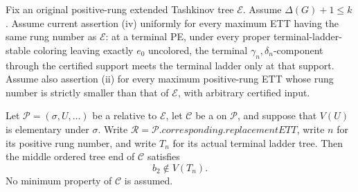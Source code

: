 \begin{lemma}
Fix an original positive-rung extended Tashkinov tree \(\mathcal E\).
Assume \(\Delta(G)+1\leq k\).  Assume current assertion (iv) uniformly
for every maximum ETT having the same rung number as \(\mathcal E\): at a
terminal PE, under every proper terminal-ladder-stable coloring leaving
exactly \(e_0\) uncolored, the terminal \(\gamma_n,\delta_n\)-component
through the certified support meets the terminal ladder only at that
support.  Assume also assertion (ii) for every maximum positive-rung ETT
whose rung number is strictly smaller than that of \(\mathcal E\), with
arbitrary certified input.

Let \(\mathcal P=(\sigma,U,\ldots)\) be a
 relative to \(\mathcal E\), let
\(\mathcal C\) be a  on \(\mathcal P\),
and suppose that \(V(U)\) is elementary under \(\sigma\).  Write
\(\mathcal R=\mathcal P.\mathit{corresponding}.\mathit{replacementETT}\),
write \(n\) for its positive rung number, and write \(T_n\) for its
actual terminal ladder tree.  Then the middle ordered tree end of
\(\mathcal C\) satisfies
\[
                         b_2\notin V(T_n).
\]
No minimum property of \(\mathcal C\) is assumed.
\end{lemma}
